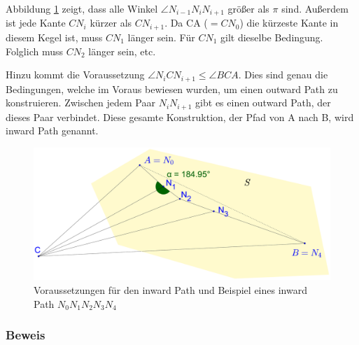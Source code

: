 \documentclass[a4paper,twoside]{IEEEtran}
\begin{document}
Abbildung \ref{fig:inward_path_prop} zeigt, dass alle Winkel $\angle{N_{i-1}N_iN_{i+1}} $ größer als $\pi $ sind.
Außerdem ist jede Kante $CN_i $ kürzer als $CN_{i+1}$. 
Da CA ($= CN_0 $) die kürzeste Kante in diesem Kegel ist, muss $CN_1 $ länger sein. 
Für $CN_1 $ gilt dieselbe Bedingung. 
Folglich muss $CN_2 $ länger sein, etc.

Hinzu kommt die Voraussetzung $\angle{N_iCN_{i+1}} \leq \angle{BCA} $.
Dies sind genau die Bedingungen, welche im Voraus bewiesen wurden, um einen outward Path zu konstruieren. 
Zwischen jedem Paar $N_iN_{i+1} $ gibt es einen outward Path, der dieses Paar verbindet.
Diese gesamte Konstruktion, der Pfad von A nach B, wird inward Path genannt.

\begin{figure}[h!]
\centering
\includegraphics[width=1\linewidth]{inward_path_prop.eps}
\caption{Voraussetzungen für den inward Path und Beispiel eines inward Path $N_0N_1N_2N_3N_4 $}
\label{fig:inward_path_prop}
\end{figure}


\subsubsection{Beweis}








\end{document}
